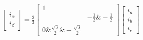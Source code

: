 \documentclass[preview]{standalone}
\begin{document}
\begin{align*}
\begin{bmatrix} i_\alpha \\ i_\beta \end{bmatrix} = \frac{2}{3} \begin{bmatrix} 1 \\& -\frac{1}{2} \& -\frac{1}{2} \\ 0 \& \frac{\sqrt{3}}{2} \& -\frac{\sqrt{3}}{2} \end{bmatrix} \begin{bmatrix} i_a \\ i_b \\ i_c \end{bmatrix}
\end{align*}
\end{document}
